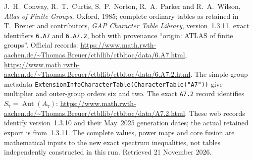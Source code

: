 J.~H.~Conway, R.~T.~Curtis, S.~P.~Norton, R.~A.~Parker and
R.~A.~Wilson, \emph{Atlas of Finite Groups}, Oxford, 1985;
complete ordinary tables as retained in T.~Breuer and contributors,
\emph{GAP Character Table Library}, version~1.3.11, exact identifiers
\texttt{6.A7} and \texttt{6.A7.2}, both with provenance
``origin: ATLAS of finite groups''.
Official records:
\url{https://www.math.rwth-aachen.de/~Thomas.Breuer/ctbllib/ctbltoc/data/6.A7.html},
\url{https://www.math.rwth-aachen.de/~Thomas.Breuer/ctbllib/ctbltoc/data/6.A7.2.html}.
The simple-group metadata
\texttt{ExtensionInfoCharacterTable(CharacterTable("A7"))}
give multiplier and outer-group orders six and two. The exact
\texttt{A7.2} record identifies $S_7=\operatorname{Aut}(A_7)$:
\url{https://www.math.rwth-aachen.de/~Thomas.Breuer/ctbllib/ctbltoc/data/A7.2.html}.
These web records identify version~1.3.10 and their May~2025
generation dates; the actual retained export is from~1.3.11.
The complete values, power maps and core fusion are mathematical
inputs to the new exact spectrum inequalities, not tables
independently constructed in this run. Retrieved 21 November 2026.
